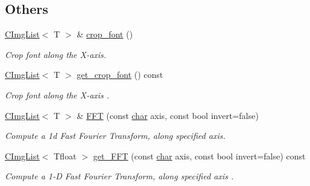 \subsection*{Others}
\begin{DoxyCompactItemize}
\item 
\mbox{\label{structcimg__library__suffixed_1_1CImgList_acae47031136aaf64c35f5e07f6272df8}} 
\hyperlink{structcimg__library__suffixed_1_1CImgList}{C\+Img\+List}$<$ T $>$ \& \hyperlink{structcimg__library__suffixed_1_1CImgList_acae47031136aaf64c35f5e07f6272df8}{crop\+\_\+font} ()
\begin{DoxyCompactList}\small\item\em Crop font along the X-\/axis. \end{DoxyCompactList}\item 
\mbox{\label{structcimg__library__suffixed_1_1CImgList_a3783a9b4937b941920639a5c9c82011d}} 
\hyperlink{structcimg__library__suffixed_1_1CImgList}{C\+Img\+List}$<$ T $>$ \hyperlink{structcimg__library__suffixed_1_1CImgList_a3783a9b4937b941920639a5c9c82011d}{get\+\_\+crop\+\_\+font} () const
\begin{DoxyCompactList}\small\item\em Crop font along the X-\/axis . \end{DoxyCompactList}\item 
\hyperlink{structcimg__library__suffixed_1_1CImgList}{C\+Img\+List}$<$ T $>$ \& \hyperlink{structcimg__library__suffixed_1_1CImgList_ac07f7527b6223ed7b6c4e02f6feab7b3}{F\+FT} (const \hyperlink{classchar}{char} axis, const bool invert=false)
\begin{DoxyCompactList}\small\item\em Compute a 1d Fast Fourier Transform, along specified axis. \end{DoxyCompactList}\item 
\mbox{\label{structcimg__library__suffixed_1_1CImgList_aa026daaaa283e6bcc688a9bb42f16001}} 
\hyperlink{structcimg__library__suffixed_1_1CImgList}{C\+Img\+List}$<$ Tfloat $>$ \hyperlink{structcimg__library__suffixed_1_1CImgList_aa026daaaa283e6bcc688a9bb42f16001}{get\+\_\+\+F\+FT} (const \hyperlink{classchar}{char} axis, const bool invert=false) const
\begin{DoxyCompactList}\small\item\em Compute a 1-\/D Fast Fourier Transform, along specified axis . \end{DoxyCompactList}\item 

\end{DoxyCompactItemize}
